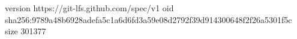 version https://git-lfs.github.com/spec/v1
oid sha256:9789a48b6928adefa5c1a6d6fd3a59e08d2792f39d914300648f2f26a5301f5c
size 301377
